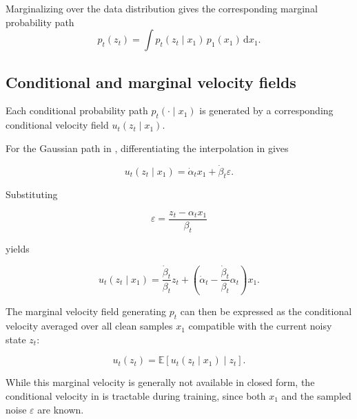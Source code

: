 Marginalizing over the data distribution gives the corresponding marginal
probability path
\begin{equation}
    p_t(z_t)
    =
    \int
    p_t(z_t\mid x_1)\,
    p_1(x_1)\,
    \mathrm{d}x_1.
    \label{eq:marginal-probability-path}
\end{equation}

\subsection{Conditional and marginal velocity fields}

Each conditional probability path $p_t(\cdot\mid x_1)$ is generated by a
corresponding conditional velocity field $u_t(z_t\mid x_1)$.

For the Gaussian path in , differentiating
the interpolation in  gives

\begin{equation}
    u_t(z_t\mid x_1)
    =
    \dot{\alpha}_t x_1
    +
    \dot{\beta}_t \varepsilon.
    \label{eq:conditional-velocity-noise}
\end{equation}

Substituting

\[
    \varepsilon
    =
    \frac{z_t-\alpha_t x_1}{\beta_t}
\]

yields

\begin{equation}
    u_t(z_t\mid x_1)
    =
    \frac{\dot{\beta}_t}{\beta_t}z_t
    +
    \left(
        \dot{\alpha}_t
        -
        \frac{\dot{\beta}_t}{\beta_t}\alpha_t
    \right)x_1.
    \label{eq:conditional-path-velocity}
\end{equation}

The marginal velocity field generating $p_t$ can then be expressed as the
conditional velocity averaged over all clean samples $x_1$ compatible with
the current noisy state $z_t$:

\begin{equation}
    u_t(z_t)
    =
    \mathbb{E}
    \left[
        u_t(z_t\mid x_1)
        \mid z_t
    \right].
    \label{eq:marginal-velocity}
\end{equation}

While this marginal velocity is generally not available in closed form, the
conditional velocity in  is tractable during
training, since both $x_1$ and the sampled noise $\varepsilon$ are known.


